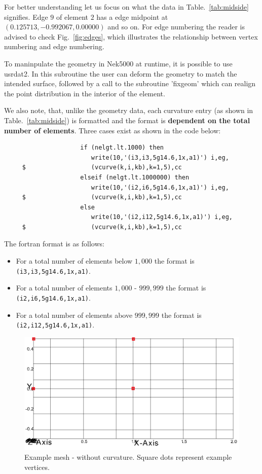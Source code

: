 \begin{description}
For better understanding let us focus on what the data in Table.~\ref{tab:midside} signifies. Edge $9$ of element $2$ has a edge  midpoint at $(0.125713, -0.992067, 0.00000)$  and so on. For edge numbering the reader is advised to check Fig.~\ref{fig:edges}, which illustrates the relationship between vertex numbering and edge numbering.

To maninpulate the geometry in Nek5000 at runtime, it is possible to use  usrdat2. In this subroutine the user can deform the geometry to match the intended surface, followed by a call to the subroutine 'fixgeom' which can realign the point distribution in the interior of the element.

We also note, that, unlike the geometry data, each curvature entry (as shown in Table.~\ref{tab:midside}) is formatted and the format is {\bf dependent on the total number of elements}. Three cases exist as shown in the code below: 
\footnotesize
\begin{verbatim}
                     if (nelgt.lt.1000) then
                        write(10,'(i3,i3,5g14.6,1x,a1)') i,eg,
     $                  (vcurve(k,i,kb),k=1,5),cc
                     elseif (nelgt.lt.1000000) then
                        write(10,'(i2,i6,5g14.6,1x,a1)') i,eg,
     $                  (vcurve(k,i,kb),k=1,5),cc
                     else
                        write(10,'(i2,i12,5g14.6,1x,a1)') i,eg,
     $                  (vcurve(k,i,kb),k=1,5),cc
\end{verbatim}
\normalsize
The fortran format is as follows:
\begin{itemize}
\item For a total number of elements below $1,000$ the format is \texttt{(i3,i3,5g14.6,1x,a1)}.
\item For a total number of elements $1,000$ - $999,999$ the format is \texttt{(i2,i6,5g14.6,1x,a1)}.
\item For a total number of elements above $999,999$ the format is \texttt{(i2,i12,5g14.6,1x,a1)}.
\end{itemize}


\begin{figure}
\begin{center}
\includegraphics[scale=0.5]{Figs/base1}
\caption{Example mesh - without curvature. Square dots represent example vertices.}
\label{fig:ex1}
\end{center}
\end{figure}


\end{description}
